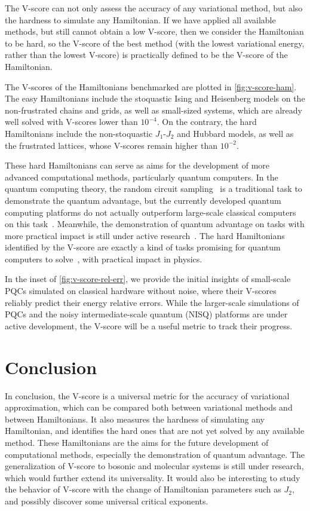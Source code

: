 The V-score can not only assess the accuracy of any variational method, but also the hardness to simulate any Hamiltonian. If we have applied all available methods, but still cannot obtain a low V-score, then we consider the Hamiltonian to be hard, so the V-score of the best method (with the lowest variational energy, rather than the lowest V-score) is practically defined to be the V-score of the Hamiltonian.

The V-scores of the Hamiltonians benchmarked are plotted in \cref{fig:v-score-ham}. The easy Hamiltonians include the stoquastic Ising and Heisenberg models on the non-frustrated chains and grids, as well as small-sized systems, which are already well solved with V-scores lower than $10^{-4}$. On the contrary, the hard Hamiltonians include the non-stoquastic $J_1$-$J_2$ and Hubbard models, as well as the frustrated lattices, whose V-scores remain higher than $10^{-2}$.

These hard Hamiltonians can serve as aims for the development of more advanced computational methods, particularly quantum computers. In the quantum computing theory, the random circuit sampling~\cite{lund2017quantum, boixo2018characterizing, arute2019quantum} is a traditional task to demonstrate the quantum advantage, but the currently developed quantum computing platforms do not actually outperform large-scale classical computers on this task~\cite{pan2022solving, aharonov2023polynomial, gao2024limitations, zhao2024leapfrogging}. Meanwhile, the demonstration of quantum advantage on tasks with more practical impact is still under active research~\cite{daley2022practical}. The hard Hamiltonians identified by the V-score are exactly a kind of tasks promising for quantum computers to solve~\cite{feynman1982simulating}, with practical impact in physics.

In the inset of \cref{fig:v-score-rel-err}, we provide the initial insights of small-scale PQCs simulated on classical hardware without noise, where their V-scores reliably predict their energy relative errors. While the larger-scale simulations of PQCs and the noisy intermediate-scale quantum (NISQ) platforms are under active development, the V-score will be a useful metric to track their progress.

\section{Conclusion}

In conclusion, the V-score is a universal metric for the accuracy of variational approximation, which can be compared both between variational methods and between Hamiltonians. It also measures the hardness of simulating any Hamiltonian, and identifies the hard ones that are not yet solved by any available method. These Hamiltonians are the aims for the future development of computational methods, especially the demonstration of quantum advantage. The generalization of V-score to bosonic and molecular systems is still under research, which would further extend its universality. It would also be interesting to study the behavior of V-score with the change of Hamiltonian parameters such as $J_2$, and possibly discover some universal critical exponents.

